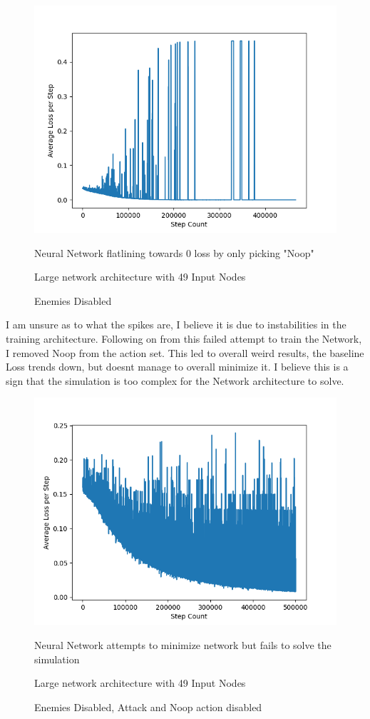 \begin{flushleft}
        \begin{figure}[H]
            \centering
            \includegraphics[width=12cm]{Images/Evaluation/NullActionFlatline.png}
            \caption*{Neural Network flatlining towards 0 loss by only picking "Noop"}
            \caption*{Large network architecture with 49 Input Nodes} 
            \caption*{Enemies Disabled}
        \end{figure}

        I am unsure as to what the spikes are, I believe it is due to instabilities in the training architecture. Following on from this failed attempt
        to train the Network, I removed Noop from the action set. This led to overall weird results, the baseline Loss trends down, but doesnt manage to
        overall minimize it. I believe this is a sign that the simulation is too complex for the Network architecture to solve. 

        \begin{figure}[H]
            \centering
            \includegraphics[width=12cm]{Images/Evaluation/AttemptedMinimiseLargeNetwork.png}
            \caption*{Neural Network attempts to minimize network but fails to solve the simulation}
            \caption*{Large network architecture with 49 Input Nodes} 
            \caption*{Enemies Disabled, Attack and Noop action disabled}
        \end{figure}


\end{flushleft}
